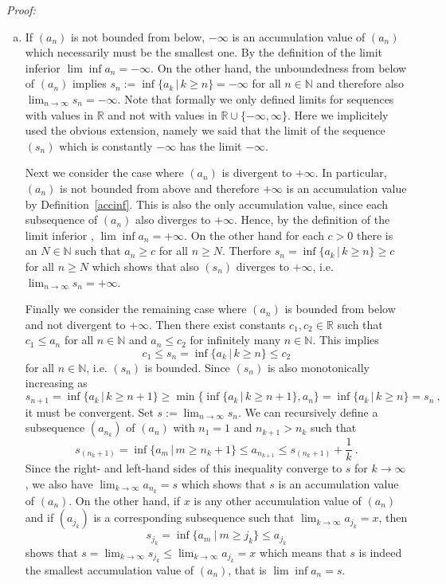 {\em Proof:}
\begin{enumerate}[a)]
\item If $(a_n)$ is not bounded from below, $-\infty$ is an accumulation value of $(a_n)$ which necessarily must be
      the smallest one. By the definition of the limit inferior $\lim\inf a_n=-\infty$. On the other hand, the unboundedness from below 
      of $(a_n)$ implies $s_n:=\inf\{a_k\,|\,k\geq n\}=-\infty$ for all $n\in\mathbb{N}$ and therefore also $\lim_{n\rightarrow \infty} s_n = -\infty$.
      Note that formally we only defined limits for sequences with values in $\mathbb{R}$ and not with values in $\mathbb{R}\cup\{-\infty,\infty\}$. 
      Here we implicitely used the obvious extension, namely we said that the limit of the sequence $(s_n)$ which is constantly
      $-\infty$ has the limit $-\infty$. 

      Next we consider the case where $(a_n)$ is divergent to $+\infty$. In particular, $(a_n)$ is not bounded from above and therefore $+\infty$
      is an accumulation value by Definition~\ref{accinf}. This is also the only accumulation value, since each subsequence 
      of $(a_n)$ also diverges to $+\infty$. Hence, by the definition of the limit inferior ,  $\lim\inf a_n=+\infty$.
      On the other hand for each $c>0$ there is an $N\in\mathbb{N}$ such that $a_n\geq  c$ for all $n\geq N$. Therfore  
      $s_n=\inf\{a_k\,|\,k\geq n\}\geq c$ for all $n\geq N$ which shows that also $(s_n)$ diverges to $+\infty$, 
      i.e. $\lim_{n\rightarrow \infty} s_n = +\infty$. 

      Finally we consider the remaining case where $(a_n)$ is bounded from below and not divergent to $+\infty$. 
      Then there exist constants $c_1,c_2\in \mathbb{R}$ such that $c_1\leq a_n$ for all $n\in\mathbb{N}$ and $a_n\leq c_2$ for infinitely
      many $n\in\mathbb{N}$. This implies $$c_1\leq s_n=\inf\{a_k\,|\,k\geq n\} \leq c_2$$ for all $n\in\mathbb{N}$,  i.e. $(s_n)$ is bounded. 
      Since $(s_n)$ is also monotonically increasing as
      $$s_{n+1}=\inf\{a_k\,|\,k\geq n+1\} \geq \min\{\inf\{a_k\,|\,k\geq n+1\},a_{n}\} = \inf\{a_k\,|\,k\geq n\} = s_n \ ,$$
      it must be convergent. Set $s:=\lim_{n\rightarrow\infty}s_n$. We can recursively define a subsequence $(a_{n_k})$ of $(a_n)$ 
      with $n_1=1$ and $n_{k+1} > n_k$ such that $$s_{(n_k+1)} =\inf\{a_m\,|\,m\geq n_k+1\}\leq a_{n_{k+1}} \leq  s_{(n_{k}+1)}+\frac{1}{k} \ .$$ 
      Since the right- and left-hand sides of this inequality converge to $s$ for $k\rightarrow \infty$, 
      we also have $\lim_{k\rightarrow \infty} a_{n_{k}} = s$ which shows
      that $s$ is an accumulation value of $(a_n)$. On the other hand, if $x$ is any other accumulation value of $(a_n)$ and if 
      $(a_{j_k})$ is a corresponding subsequence such that $\lim_{k\rightarrow\infty}a_{j_k} = x$, then 
      $$s_{j_k}=\inf\{a_m~|~ m\geq j_k\} \leq a_{j_k}$$ shows that $s=\lim_{k\rightarrow\infty} s_{j_k} \leq \lim_{k\rightarrow\infty} a_{j_k}=x$
      which means that $s$ is indeed the smallest accumulation value of $(a_n)$, that is $\lim\inf a_n=s.$  


\end{enumerate}
